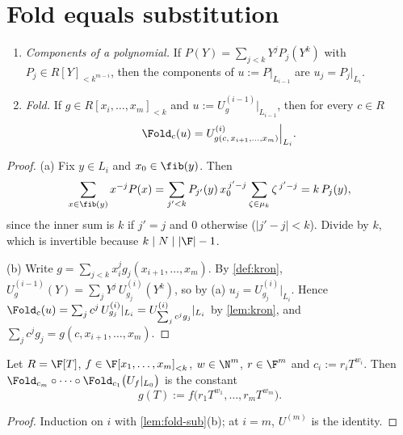 \section{Fold equals substitution}

\setcounter{lemma}{1}\begin{lemma}\label{lem:fold-sub}
\leavevmode
\begin{enumerate}
\item[(a)] \emph{Components of a polynomial.} If $P(Y)=\sum_{j<k}Y^jP_j(Y^k)$ with
$P_j\in R[Y]_{<k^{m-i}}$, then the components of $u:=P|_{L_{i-1}}$ are $u_j=P_j|_{L_i}$.
\item[(b)] \emph{Fold.} If $g\in R[x_i,\dots,x_m]_{<k}$ and $u:=U^{(i-1)}_g|_{L_{i-1}}$,
then for every $c\in R$
\[
\Fold_c(u)=U^{(i)}_{g(c,\,x_{i+1},\dots,x_m)}\Big|_{L_i}.
\]
\end{enumerate}
\end{lemma}

\begin{proof}
(a) Fix $y\in L_i$ and $x_0\in\fib(y)$. Then
\[
\sum_{x\in\fib(y)}x^{-j}P(x)=\sum_{j'<k}P_{j'}(y)\,x_0^{\,j'-j}\sum_{\zeta\in\mu_k}\zeta^{\,j'-j}=k\,P_j(y),
\]
since the inner sum is $k$ if $j'=j$ and $0$ otherwise ($|j'-j|<k$). Divide by $k$,
which is invertible because $k\mid N\mid|\F|-1$.

(b) Write $g=\sum_{j<k}x_i^j g_j(x_{i+1},\dots,x_m)$. By \cref{def:kron},
$U^{(i-1)}_g(Y)=\sum_j Y^j\,U^{(i)}_{g_j}(Y^k)$, so by (a) $u_j=U^{(i)}_{g_j}|_{L_i}$.
Hence $\Fold_c(u)=\sum_j c^j\,U^{(i)}_{g_j}|_{L_i}=U^{(i)}_{\sum_j c^jg_j}|_{L_i}$ by
\cref{lem:kron}, and $\sum_j c^jg_j=g(c,x_{i+1},\dots,x_m)$.
\end{proof}

\begin{corollary}\label{cor:terminal}
Let $R=\F[T]$, $f\in\F[x_1,\dots,x_m]_{<k}$, $w\in\N^m$, $r\in\F^m$ and
$c_i:=r_iT^{w_i}$. Then
$\Fold_{c_m}\circ\cdots\circ\Fold_{c_1}\big(U_f|_{L_0}\big)$ is the constant
\[
g(T):=f\big(r_1T^{w_1},\dots,r_mT^{w_m}\big).
\]
\end{corollary}

\begin{proof}
Induction on $i$ with \cref{lem:fold-sub}(b); at $i=m$, $U^{(m)}$ is the identity.
\end{proof}
